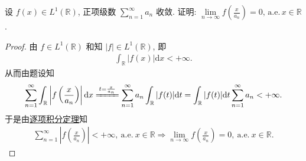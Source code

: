 \documentclass[../../main.tex]{subfiles}%
\begin{document}
\begin{example}
设 $f(x) \in L^1(\mathbb{R})$, 正项级数 $\sum\limits_{n=1}^\infty a_n$ 收敛. 证明: $\lim\limits_{n \to \infty} f\left(\frac{x}{a_n}\right) = 0,\,\text{a.e.}\,x \in \mathbb{R}$.
\end{example}
\begin{proof}

由 $f\in L^1(\mathbb{R})$ 和知 $|f|\in L^1(\mathbb{R})$, 即
\begin{align*}
\int_{\mathbb{R}} |f(x)| \mathrm{d}x < +\infty.
\end{align*}
从而由题设知
\begin{align*}
\sum_{n=1}^{\infty} \int_{\mathbb{R}} \left| f\left( \frac{x}{a_n} \right) \right| \mathrm{d}x \xlongequal{t=\frac{x}{a_n}} \sum_{n=1}^{\infty} a_n \int_{\mathbb{R}} |f(t)| \mathrm{d}t = \int_{\mathbb{R}} |f(t)| \mathrm{d}t \sum_{n=1}^{\infty} a_n < +\infty.
\end{align*}
于是由\hyperref[corollary:逐项积分定理]{逐项积分定理}知
\begin{align*}
\sum_{n=1}^{\infty} \left| f\left( \frac{x}{a_n} \right) \right| < +\infty,\ \mathrm{a.e.}\ x\in \mathbb{R} \Longrightarrow \lim\limits_{n\rightarrow \infty} f\left( \frac{x}{a_n} \right) =0,\ \mathrm{a.e.}\ x\in \mathbb{R}.
\end{align*}
\end{proof}
\end{document}
